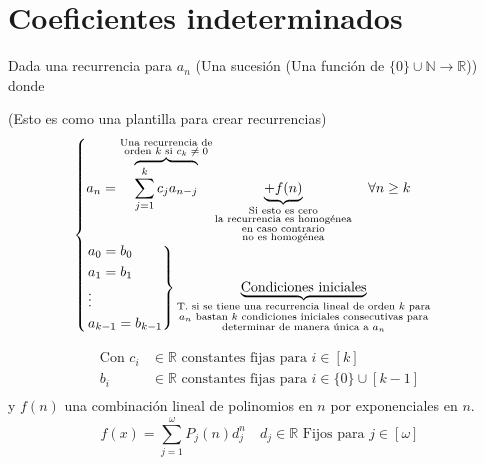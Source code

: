 \documentclass[../main.tex]{subfiles}
\begin{document}
\chapter{Coeficientes indeterminados}%

\thispagestyle{fancy}

Dada una recurrencia para $a_n$ (Una sucesión (Una función
de $\{0\}\cup\mathbb{N}\rightarrow\mathbb{R}$)) donde

(Esto es como una plantilla para crear recurrencias)
\[
	\begin{cases}
		a_n =
		\overbrace
		{
			\sum_{j=1}^kc_ja_{n-j}
		}^
		{
			\substack
			{
				\text{Una recurrencia de}\\
				\text{orden $k$ si $c_k\neq 0$}\\
			}
		}
		\underbrace
		{
			+ f(n)
		}_
		{
			\substack
			{
				\text{Si esto es cero}\\
				\text{la recurrencia es homogénea}\\
				\text{en caso contrario}\\
				\text{no es homogénea}
			}
		}
		\quad \forall n \geq k\\
		\begin{rcases}
			a_0 = b_0\\
			a_1 = b_1\\
			\vdots\\
			a_{k-1} = b_{k-1}
		\end{rcases}
		\underbrace
		{
			\text{Condiciones iniciales}
		}_
		{
			\substack
			{
				\text{T. si se tiene una recurrencia lineal de orden $k$ para}\\
				\text{$a_n$ bastan $k$ condiciones iniciales consecutivas para}\\
				\text{determinar de manera única a $a_n$}
			}
		}
	\end{cases}
\]


\begin{align*}
	\text{Con } c_i&\in\mathbb{R} \text{ constantes fijas para } i\in[k]\\
	b_i&\in\mathbb{R} \text{ constantes fijas para } i\in\{0\}\cup[k-1]\\
\end{align*}
y $f(n)$ una combinación lineal de polinomios en $n$ por exponenciales en $n$.
\[
	f(x)=\sum_{j=1}^\omega P_j(n)d_j^n \quad
	d_j\in\mathbb{R} \text{ Fijos para $j\in[\omega]$}
\]
\end{document}
